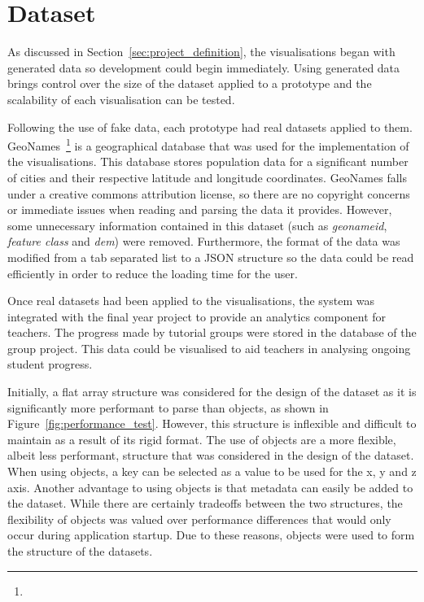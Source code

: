 \section{Dataset} {
\label{sec:dataset}

	As discussed in Section~\ref{sec:project_definition}, the visualisations began with generated data so development could begin immediately. Using generated data brings control over the size of the dataset applied to a prototype and the scalability of each visualisation can be tested. 

	Following the use of fake data, each prototype had real datasets applied to them. GeoNames~\footnote{} is a geographical database that was used for the implementation of the visualisations. This database stores population data for a significant number of cities and their respective latitude and longitude coordinates. GeoNames falls under a creative commons attribution license, so there are no copyright concerns or immediate issues when reading and parsing the data it provides. However, some unnecessary information contained in this dataset (such as \emph{geonameid}, \emph{feature class} and \emph{dem}) were removed. Furthermore, the format of the data was modified from a tab separated list to a JSON structure so the data could be read efficiently in order to reduce the loading time for the user.

	Once real datasets had been applied to the visualisations, the system was integrated with the final year project to provide an analytics component for teachers. The progress made by tutorial groups were stored in the database of the group project. This data could be visualised to aid teachers in analysing ongoing student progress.

	Initially, a flat array structure was considered for the design of the dataset as it is significantly more performant to parse than objects, as shown in Figure~\ref{fig:performance_test}. However, this structure is inflexible and difficult to maintain as a result of its rigid format. The use of objects are a more flexible, albeit less performant, structure that was considered in the design of the dataset. When using objects, a key can be selected as a value to be used for the x, y and z axis. Another advantage to using objects is that metadata can easily be added to the dataset. While there are certainly tradeoffs between the two structures, the flexibility of objects was valued over performance differences that would only occur during application startup. Due to these reasons, objects were used to form the structure of the datasets.

	

}

